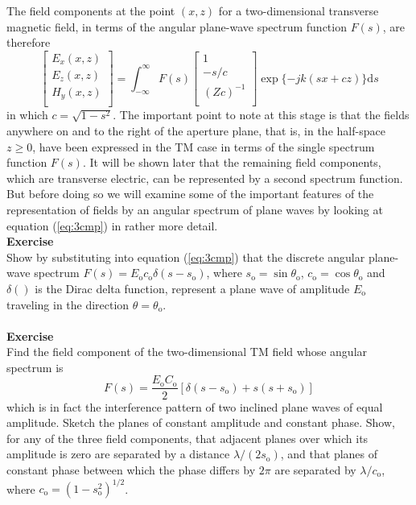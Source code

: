The field components at the point $(x,z)$ for a two-dimensional transverse magnetic field, in terms of the angular plane-wave spectrum function $F(s)$, are therefore
\begin{equation}
\begin{bmatrix}
E_x(x,z)\\
E_z(x,z)\\
H_y(x,z)\\
\end{bmatrix}
=\int_{-\infty}^{\infty}F(s)
\begin{bmatrix}
1\\
-s/c\\
(Zc)^{-1}\\
\end{bmatrix}
\exp\{-jk(sx+cz)\}\mathrm{d}s
\label{eq:3cmp}
\end{equation}
in which $c=\sqrt{1-s^2}$. The important point to note at this stage is that the fields anywhere on and to the right of the aperture plane, that is, in the half-space $z\geqslant0$, have been expressed in the TM case in terms of the single spectrum function $F(s)$. It will be shown later that the remaining field components, which are transverse electric, can be represented by a second spectrum function. But before doing so we will examine some of the important features of the representation of fields by an angular spectrum of plane waves by looking at equation (\ref{eq:3cmp}) in rather more detail.\\
\noindent \textbf{Exercise}\\
\noindent Show by substituting into equation (\ref{eq:3cmp}) that the discrete angular plane-wave  spectrum $F(s)=E_\mathrm{o}c_\mathrm{o}\delta(s-s_\mathrm{o})$, where $s_\mathrm{o}=\sin\theta_\mathrm{o}$, $c_\mathrm{o}=\cos\theta_\mathrm{o}$ and $\delta( )$ is the Dirac delta function, represent a plane wave of amplitude $E_\mathrm{o}$ traveling in the direction $\theta=\theta_\mathrm{o}$.\\
\\
\noindent \textbf{Exercise}\\
\noindent Find the field component of the two-dimensional TM field whose angular spectrum is
\begin{displaymath}
F(s)=\dfrac{E_\mathrm{o}C_\mathrm{o}}{2}[\delta(s-s_\mathrm{o})+s(s+s_\mathrm{o})]
\end{displaymath}
which is in fact the interference pattern of two inclined plane waves of equal amplitude. Sketch the planes of constant amplitude and constant phase. Show, for any of the three field components, that adjacent planes over which its amplitude is zero are separated by a distance $\lambda/(2s_\mathrm{o})$, and that planes of constant phase between which the phase differs by $2\pi$ are separated by $\lambda/c_\mathrm{o}$, where $c_\mathrm{o}=(1-s_\mathrm{o}^2)^{1/2}$.\\
